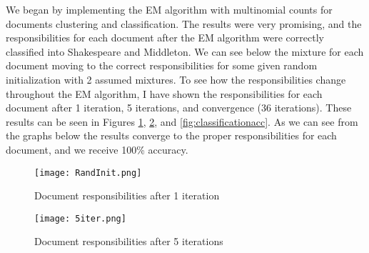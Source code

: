 \documentclass[paper=a4, fontsize=11pt]{scrartcl} %
\begin{document}

We began by implementing the EM algorithm with multinomial counts for documents clustering and classification.  
The results were very promising, and the responsibilities for each document after the EM algorithm were correctly classified into Shakespeare and Middleton.
We can see below the mixture for each document moving to the correct responsibilities for some given random initialization with 2 assumed mixtures.  
To see how the responsibilities change throughout the EM algorithm, I have shown the responsibilities for each document after 1 iteration, 5 iterations, and convergence (36 iterations).
These results can be seen in Figures \ref{fig:randinit}, \ref{fig:iter}, and \ref{fig:classificationacc}.
As we can see from the graphs below the results converge to the proper responsibilities for each document, and we receive 100\% accuracy.

\begin{figure}
\centering
\texttt{[image: RandInit.png]}
\caption{Document responsibilities after 1 iteration}
\label{fig:randinit}
\end{figure}

\begin{figure}
\centering
\texttt{[image: 5iter.png]}
\caption{Document responsibilities after 5 iterations}
\label{fig:iter}
\end{figure}
\end{document}
